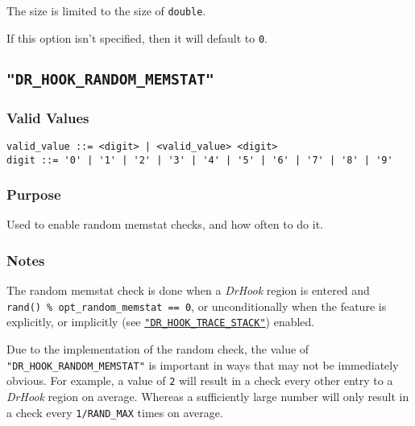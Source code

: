 The size is limited to the size of \verb|double|.

If this option isn't specified, then it will default to \verb|0|.



\subsection{\texttt{"DR\_HOOK\_RANDOM\_MEMSTAT"}}
\label{section:flags:DR_HOOK_RANDOM_MEMSTAT}
\vspace{-2ex}
\subsubsection{Valid Values}
\vspace{-2ex}
\verb+valid_value ::= <digit> | <valid_value> <digit> + \\
\verb+digit ::= '0' | '1' | '2' | '3' | '4' | '5' | '6' | '7' | '8' | '9'+

\vspace{-2ex}
\subsubsection{Purpose}
\vspace{-2ex}
Used to enable random memstat checks, and how often to do it.

\vspace{-2ex}
\subsubsection{Notes}
\vspace{-2ex}
 The random memstat check is done when a \textit{DrHook} region is entered and\\ \verb|rand() % opt_random_memstat == 0|, or unconditionally when the feature is explicitly, or implicitly (see \hyperref[section:flags:DR_HOOK_TRACE_STACK]{\texttt{"DR\_HOOK\_TRACE\_STACK"}}) enabled.

 Due to the implementation of the random check, the value of \texttt{"DR\_HOOK\_RANDOM\_MEMSTAT"} is important in ways that may not be immediately obvious. For example, a value of \verb|2| will result in a check every other entry to a \textit{DrHook} region on average. Whereas a sufficiently large number will only result in a check every \verb|1/RAND_MAX| times on average.

